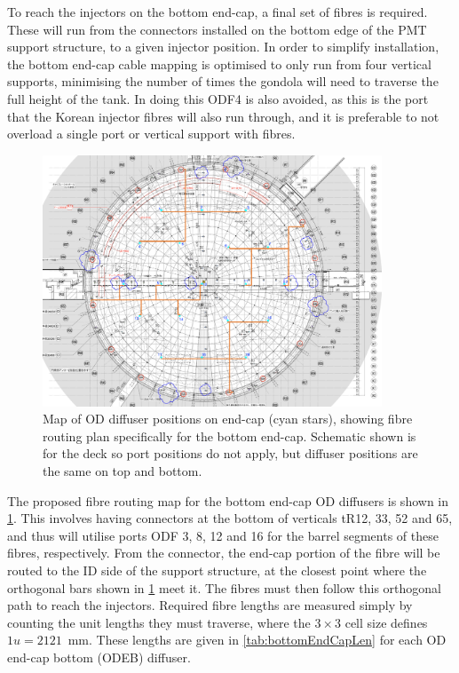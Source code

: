 \documentclass[a4paper,11pt]{article}
\begin{document}
To reach the injectors on the bottom end-cap, a final set of fibres is required. These will run from the connectors installed on the bottom edge of the PMT support structure, to a given injector position. In order to simplify installation, the bottom end-cap cable mapping is optimised to only run from four vertical supports, minimising the number of times the gondola will need to traverse the full height of the tank. In doing this ODF4 is also avoided, as this is the port that the Korean injector fibres will also run through, and it is preferable to not overload a single port or vertical support with fibres.
\begin{figure}[h]
\centering
\includegraphics[width=0.9\textwidth]{bottomEndCapMap}
\caption{Map of OD diffuser positions on end-cap (cyan stars), showing fibre routing plan specifically for the bottom end-cap. Schematic shown is for the deck so port positions do not apply, but diffuser positions are the same on top and bottom.}\label{fig:bottomEndCap}
\end{figure}
The proposed fibre routing map for the bottom end-cap OD diffusers is shown in \cref{fig:bottomEndCap}. This involves having connectors at the bottom of verticals tR12, 33, 52 and 65, and thus will utilise ports ODF 3, 8, 12 and 16 for the barrel segments of these fibres, respectively. From the connector, the end-cap portion of the fibre will be routed to the ID side of the support structure, at the closest point where the orthogonal bars shown in \cref{fig:bottomEndCap} meet it. The fibres must then follow this orthogonal path to reach the injectors. Required fibre lengths are measured simply by counting the unit lengths they must traverse, where the $3\times 3$ cell size defines $1u=2121$~mm. These lengths are given in \cref{tab:bottomEndCapLen} for each OD end-cap bottom (ODEB) diffuser.
\end{document}
